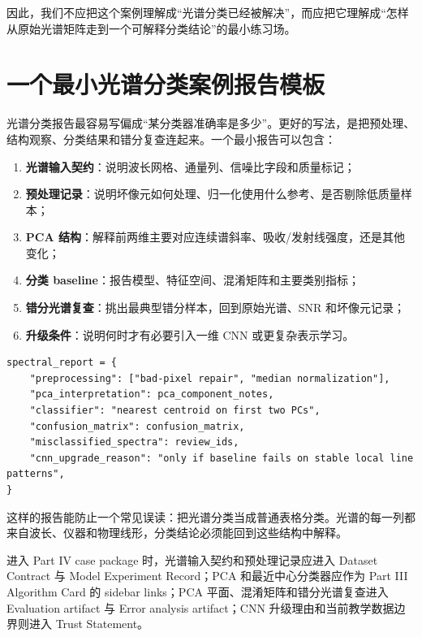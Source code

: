 因此，我们不应把这个案例理解成“光谱分类已经被解决”，而应把它理解成“怎样从原始光谱矩阵走到一个可解释分类结论”的最小练习场。

\section{一个最小光谱分类案例报告模板}

光谱分类报告最容易写偏成“某分类器准确率是多少”。更好的写法，是把预处理、结构观察、分类结果和错分复查连起来。一个最小报告可以包含：

\begin{enumerate}
    \item \textbf{光谱输入契约}：说明波长网格、通量列、信噪比字段和质量标记；
    \item \textbf{预处理记录}：说明坏像元如何处理、归一化使用什么参考、是否剔除低质量样本；
    \item \textbf{PCA 结构}：解释前两维主要对应连续谱斜率、吸收/发射线强度，还是其他变化；
    \item \textbf{分类 baseline}：报告模型、特征空间、混淆矩阵和主要类别指标；
    \item \textbf{错分光谱复查}：挑出最典型错分样本，回到原始光谱、SNR 和坏像元记录；
    \item \textbf{升级条件}：说明何时才有必要引入一维 CNN 或更复杂表示学习。
\end{enumerate}

\begin{examplebox}[光谱分类案例报告骨架]
\begin{lstlisting}[style=pythonstyle]
spectral_report = {
    "preprocessing": ["bad-pixel repair", "median normalization"],
    "pca_interpretation": pca_component_notes,
    "classifier": "nearest centroid on first two PCs",
    "confusion_matrix": confusion_matrix,
    "misclassified_spectra": review_ids,
    "cnn_upgrade_reason": "only if baseline fails on stable local line patterns",
}
\end{lstlisting}
\end{examplebox}

这样的报告能防止一个常见误读：把光谱分类当成普通表格分类。光谱的每一列都来自波长、仪器和物理线形，分类结论必须能回到这些结构中解释。

进入 Part IV case package 时，光谱输入契约和预处理记录应进入 Dataset Contract 与 Model Experiment Record；PCA 和最近中心分类器应作为 Part III Algorithm Card 的 sidebar links；PCA 平面、混淆矩阵和错分光谱复查进入 Evaluation artifact 与 Error analysis artifact；CNN 升级理由和当前教学数据边界则进入 Trust Statement。

